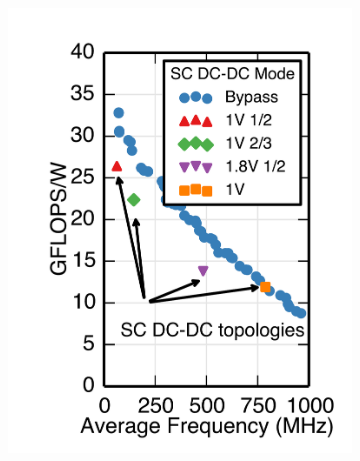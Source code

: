 \documentclass[graybox]{svmult}
\begin{document}
\begin{figure}
  \centering
  \hspace*{\fill}
  \begin{subfigure}[t]{0.23\textwidth}
  \centering
  \includegraphics[width=\textwidth]{6-raven3-shmoo-a}
  \caption{}
  \label{fig:6-raven3-shmoo-a}
  \end{subfigure}
  \hspace*{\fill}
  \begin{subfigure}[t]{0.23\textwidth}
  \centering

\end{subfigure}
\end{figure}
\end{document}
